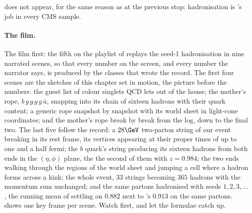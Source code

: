 \MG does not appear, for the same reason as at the previous stop:
hadronisation is \PYTHIA's job in every CMS sample.

\paragraph{The film.}
\label{sec:children_getting_married:animation}
The film first: the fifth on the playlist of \jitjetworld replays the
seed-1 hadronisation in nine narrated scenes, so that every number on the
screen, and every number the narrator says, is produced by the classes that
wrote the record. The first four scenes are the sketches of this chapter
set in motion, the picture before the numbers: the guest list of colour
singlets QCD lets out of the house; the mother's rope, $b\,g\,g\,g\,g\,\bar u$,
snapping into its chain of sixteen hadrons with their quark content; a
generic rope snapshot by snapshot with its world sheet in light-cone
coordinates; and the mother's rope break by break from the  log,
down to the final two. The last five follow the record: a $28\GeV$
two-parton string of our event breaking in its rest frame, its vertices
appearing at their proper times of up to one and a half fermi; the $b$
quark's string producing its sixteen hadrons from both ends in the
$(\eta,\phi)$ plane, the \Bstarbar the second of them with $z=0.984$; the
two ends walking through the regions of the world sheet and jumping a cell
where a hadron forms across a kink; the whole event, $33$ strings becoming
$365$ hadrons with the momentum sum unchanged; and the same partons
hadronised with seeds $1,2,3,\ldots$, the running mean of \xE settling on
$0.882$ next to \PYTHIA's $0.913$ on the same partons.
 shows one key frame per scene.
Watch first, and let the formulae catch up.

